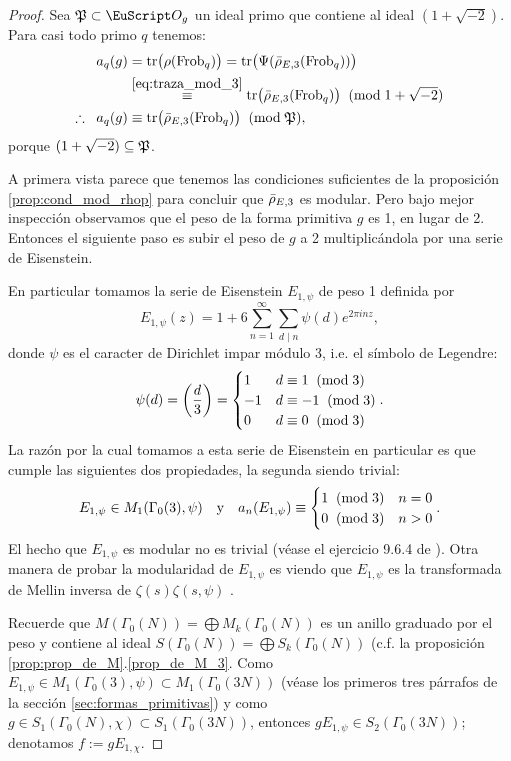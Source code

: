 \documentclass[../../tesis_maestria]{subfiles}
\begin{document}
\begin{proof}
  Sea $\fP\subset\Oo_g$ un ideal primo que contiene al ideal $(1+\sqrt{-2})$. Para casi todo primo $q$ tenemos:
  \begin{align}
    a_q(g)
    &=\mathrm{tr}\big(\rho(\mathrm{Frob}_q)\big)=\mathrm{tr}\big(\Psi(\bar{\rho}_{E,3}(\mathrm{Frob}_q))\big)\nonumber\\
    &\overset{\ref{eq:traza_mod_3}}{\equiv}
      \mathrm{tr}\big(\bar{\rho}_{E,3}(\mathrm{Frob}_q)\big) \;\;(\mathrm{mod}\; 1+\sqrt{-2})\nonumber\\
    \therefore\;\; a_q(g)
    &\equiv\mathrm{tr}\big(\bar{\rho}_{E,3}(\mathrm{Frob}_q)\big) \;\;(\mathrm{mod}\; \mathfrak{P}),\label{eq:cong_coef_fourier}
  \end{align}
  porque $(1+\sqrt{-2})\subseteq\mathfrak{P}$.


  A primera vista parece que tenemos las condiciones suficientes de la proposici\'on \ref{prop:cond_mod_rhop} para concluir que $\bar{\rho}_{E,3}$ es modular. Pero bajo mejor inspecci\'on observamos que el peso de la forma primitiva $g$ es 1, en lugar de 2. Entonces el siguiente paso es subir el peso de $g$ a 2 multiplic\'andola por una serie de Eisenstein.

En particular tomamos la serie de Eisenstein $E_{1,\psi}$ de peso 1 definida por
  \[
    E_{1,\psi}(z)=1+6\sum_{n=1}^{\infty}\sum_{d\mid n}\psi(d)e^{2\pi inz},
  \]
donde $\psi$ es el caracter de Dirichlet impar m\'odulo 3, i.e. el s\'imbolo de Legendre:
  \[
    \psi(d)=\left( \frac{d}{3} \right)=
    \begin{cases}
      1 &d\equiv1\;\;(\mathrm{mod}\; 3)\\
      -1&d\equiv -1\;\;(\mathrm{mod}\; 3)\\
      0&d\equiv0\;\;(\mathrm{mod}\; 3)
    \end{cases}.
  \]
  La raz\'on por la cual tomamos a esta serie de Eisenstein en particular es que cumple las siguientes dos propiedades, la segunda siendo trivial:
  \begin{equation}
    \label{eq:prop_eisenstein_peso1}
    E_{1,\psi}\in M_1(\Gamma_0(3),\psi)
    \quad\mathrm{y}\quad a_n(E_{1,\psi})\equiv
    \begin{cases}
        1 \;\;(\mathrm{mod}\; 3) & n=0\\
        0 \;\;(\mathrm{mod}\; 3) & n>0
      \end{cases}.
    \end{equation}
    El hecho que $E_{1,\psi}$ es modular no es trivial (v\'ease el ejercicio 9.6.4 de \cite{DiamondShurmanAFCIMF}). Otra manera de probar la modularidad de $E_{1,\psi}$ es viendo que $E_{1,\psi}$ es la transformada de Mellin inversa de $\zeta(s)\zeta(s,\psi)$ \cite{Wiles}.%
    
    Recuerde que $M(\Gamma_0(N))=\bigoplus M_k(\Gamma_0(N))$ es un anillo graduado por el peso y contiene al ideal $S(\Gamma_0(N))=\bigoplus S_k(\Gamma_0(N))$ (c.f. la proposici\'on \ref{prop:prop_de_M}.\ref{prop_de_M_3}. Como $E_{1,\psi}\in M_1(\Gamma_0(3),\psi)\subset M_1(\Gamma_0(3N))$ (v\'ease los primeros tres p\'arrafos de la secci\'on \ref{sec:formas_primitivas}) y como $g\in S_1(\Gamma_0(N),\chi)\subset S_1(\Gamma_0(3N))$, entonces $gE_{1,\psi}\in S_2(\Gamma_0(3N))$; denotamos $f:=gE_{1,\chi}$.
    

\end{proof}
\end{document}
